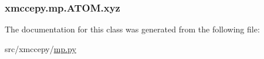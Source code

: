 \hypertarget{classxmccepy_1_1mp_1_1_a_t_o_m_aebf9f0b985ccd236b1cd2dbf1161941e}{
\subsubsection[{xyz}]{\setlength{\rightskip}{0pt plus 5cm}xmccepy.\-mp.\-A\-T\-O\-M.\-xyz}}\label{classxmccepy_1_1mp_1_1_a_t_o_m_aebf9f0b985ccd236b1cd2dbf1161941e}


The documentation for this class was generated from the following file\-:\begin{DoxyCompactItemize}
\item 
src/xmccepy/\hyperlink{mp_8py}{mp.\-py}\end{DoxyCompactItemize}
